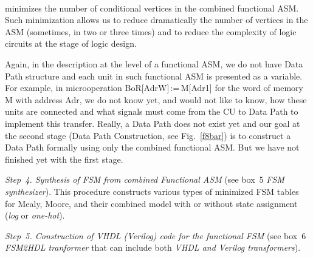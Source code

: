 \begin{figure} %
\vspace*{1pt}
\begin{center}
\mbox{%
\epsfxsize=136.614mm
}
\end{center}
\vspace*{-9pt}
\vspace*{-6pt}
\end{figure}

\begin{multicols}{2}
\noindent
minimizes the number of conditional vertices in the combined functional
ASM. Such minimization allows us to reduce dramatically the number of vertices in the ASM (sometimes, in
two or three times) and to reduce the complexity of logic circuits at the stage of logic design.
{

}
 
 Again, in the description at the level of a functional ASM,
we do not have Data Path structure and each unit
in such functional ASM is presented as a variable. 
For example,
in microoperation BoR[AdrW]\,:=\,M[Adr1]
for the word of memory M with address Adr, we do not know yet,
and would not like to know, how these units are
connected and what signals must come from the CU to Data Path to implement this transfer. Really, a
Data Path does not exist yet and our goal at the second stage (Data Path Construction, see Fig.~\ref{f8bar}) is to
construct a Data Path formally using only the combined functional ASM. But we
have not finished yet with the first stage.
{%

}


\textit{Step~4. Synthesis of FSM from combined Functional ASM} (see box~5
\textit{FSM synthesizer}). This
procedure constructs various types of minimized FSM
tables for Mealy,
Moore, and their
combined model with or without state assignment (\textit{log} or \textit{one-hot}).

\textit{Step~5. Construction of VHDL (Verilog) code for the functional FSM}
(see box~6 \textit{FSM2HDL tranformer} that can include both \textit{VHDL and
Verilog transformers}).

\begin{figure*} %
\vspace*{1pt}
\begin{center}
\mbox{%
\epsfxsize=164.46mm
}
\end{center}
\vspace*{-9pt}
\begin{minipage}[t]{79.5mm}
\end{minipage}
\hfill
\begin{minipage}[t]{79.5mm}
\end{minipage}
\end{figure*}


\end{multicols}
